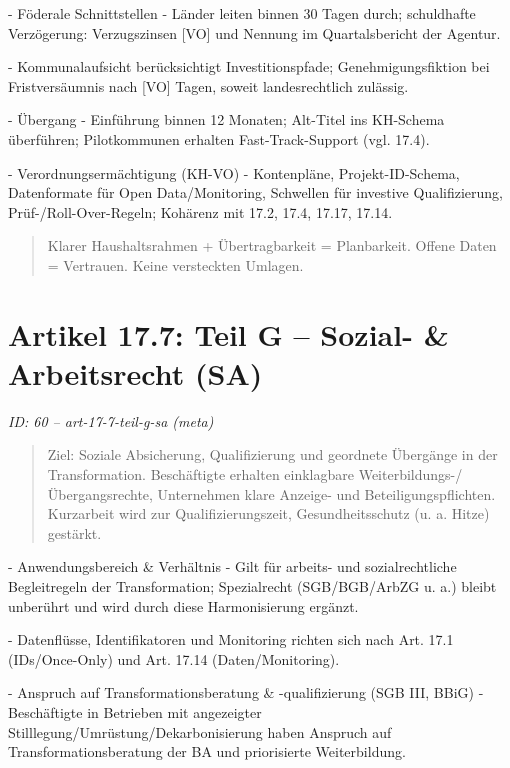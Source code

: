 \documentclass[12pt,a4paper]{scrartcl}
\begin{document}
- Föderale Schnittstellen
- Länder leiten binnen 30 Tagen durch; schuldhafte Verzögerung: Verzugszinsen [VO] und Nennung im Quartalsbericht der Agentur.

- Kommunalaufsicht berücksichtigt Investitionspfade; Genehmigungsfiktion bei Fristversäumnis nach [VO] Tagen, soweit landesrechtlich zulässig.

- Übergang
- Einführung binnen 12 Monaten; Alt-Titel ins KH-Schema überführen; Pilotkommunen erhalten Fast-Track-Support (vgl. 17.4).

- Verordnungsermächtigung (KH-VO)
- Kontenpläne, Projekt-ID-Schema, Datenformate für Open Data/Monitoring, Schwellen für investive Qualifizierung, Prüf-/Roll-Over-Regeln; Kohärenz mit 17.2, 17.4, 17.17, 17.14.

{\footnotesize\begin{quote}
Klarer Haushaltsrahmen + Übertragbarkeit = Planbarkeit. Offene Daten = Vertrauen. Keine versteckten Umlagen.
\end{quote}}



\section[Artikel 17.7: Teil G -- Sozial- \& Arbeitsrecht (SA)]{Artikel 17.7: Teil G -- Sozial- \& Arbeitsrecht (SA)}
\noindent\textit{ID: 60 -- art-17-7-teil-g-sa (meta)}

\begin{quote}
Ziel: Soziale Absicherung, Qualifizierung und geordnete Übergänge in der Transformation. Beschäftigte erhalten einklagbare Weiterbildungs-/Übergangsrechte, Unternehmen klare Anzeige- und Beteiligungspflichten. Kurzarbeit wird zur Qualifizierungszeit, Gesundheitsschutz (u. a. Hitze) gestärkt.
\end{quote}

- Anwendungsbereich \& Verhältnis
- Gilt für arbeits- und sozialrechtliche Begleitregeln der Transformation; Spezialrecht (SGB/BGB/ArbZG u. a.) bleibt unberührt und wird durch diese Harmonisierung ergänzt.

- Datenflüsse, Identifikatoren und Monitoring richten sich nach Art. 17.1 (IDs/Once-Only) und Art. 17.14 (Daten/Monitoring).

- Anspruch auf Transformationsberatung \& -qualifizierung (SGB III, BBiG)
- Beschäftigte in Betrieben mit angezeigter Stilllegung/Umrüstung/Dekarbonisierung haben Anspruch auf Transformationsberatung der BA und priorisierte Weiterbildung.
\end{document}
